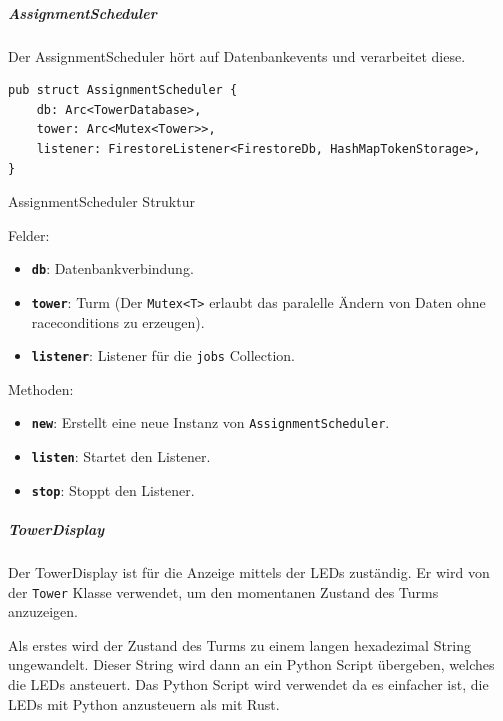 \subparagraph{AssignmentScheduler}

Der AssignmentScheduler hört auf Datenbankevents und verarbeitet diese.

\begin{listing}[H]
  \begin{verbatim}
pub struct AssignmentScheduler {
    db: Arc<TowerDatabase>,
    tower: Arc<Mutex<Tower>>,
    listener: FirestoreListener<FirestoreDb, HashMapTokenStorage>,
}
\end{verbatim}
  \caption{AssignmentScheduler Struktur}
  \label{lst:assignment_scheduler_struktur}
\end{listing}

Felder:
\begin{itemize}
  \item \textbf{\texttt{db}}: Datenbankverbindung.
  \item \textbf{\texttt{tower}}: Turm (Der \texttt{Mutex<T>} erlaubt das paralelle Ändern von Daten ohne \glspl{racecondition} zu erzeugen).
  \item \textbf{\texttt{listener}}: Listener für die \texttt{jobs} Collection.
\end{itemize}

Methoden:
\begin{itemize}
  \item \textbf{\texttt{new}}: Erstellt eine neue Instanz von \texttt{AssignmentScheduler}.
  \item \textbf{\texttt{listen}}: Startet den Listener.
  \item \textbf{\texttt{stop}}: Stoppt den Listener.
\end{itemize}


\subparagraph{TowerDisplay}

Der TowerDisplay ist für die Anzeige mittels der LEDs zuständig. Er wird von der \texttt{Tower} Klasse verwendet, um den momentanen Zustand des Turms anzuzeigen.

Als erstes wird der Zustand des Turms zu einem langen hexadezimal String ungewandelt. Dieser String wird dann an ein Python Script übergeben, welches die LEDs ansteuert. Das Python Script wird verwendet da es einfacher ist, die LEDs mit Python anzusteuern als mit Rust.